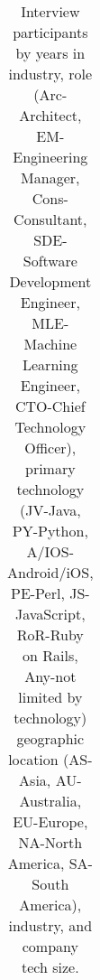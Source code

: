 \begin{table}[]
\begin{tabular}{p{.4cm}p{.4cm}p{.5cm}p{.8cm}p{.5cm}p{2.2cm}r{.5cm}}
    \bottomrule
    \end{tabular}
    \caption{Interview participants by years in industry, role (Arc-Architect, EM-Engineering Manager, Cons-Consultant, SDE-Software Development Engineer, MLE-Machine Learning Engineer, CTO-Chief Technology Officer), primary technology (JV-Java, PY-Python, A/IOS-Android/iOS, PE-Perl, JS-JavaScript, RoR-Ruby on Rails, Any-not limited by technology) geographic location (AS-Asia, AU-Australia, EU-Europe, NA-North America, SA-South America), industry, and company tech size.}
    \label{tab:interviewee-profile}
\end{table}
